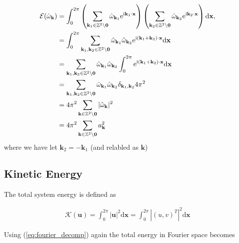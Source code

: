 \documentclass[9pt]{article}
\newcommand{\ii}{\mathrm{i}}      								  %
\newcommand{\e}{\mathrm{e}}      								  %
\newcommand{\bfu}{\mathbf{u}}											%
\newcommand{\omegahat}[1]{\hat{\omega}_{ \mathbf{#1} } }								%
\newcommand{\bfx}{\mathbf{x}}								%
\newcommand{\bfk}{\mathbf{k}}								%
\newcommand{\bfkn}[1]{\mathbf{k}_{#1}}								%
\begin{document}
\begin{align}
	\mathcal{E}(\omegahat{k}) &= \int_{0}^{2\pi} \left(\sum_{\mathbf{k}_1\in \mathbb{Z}^2\setminus \mathbf{0}}\hat{\omega}_{\mathbf{k}_1}\e^{\ii \mathbf{k}_1\cdot \mathbf{x}}\right)\left(\sum_{\mathbf{k}_2\in \mathbb{Z}^2\setminus \mathbf{0}}\hat{\omega}_{\mathbf{k}_2}\e^{\ii \mathbf{k}_2\cdot \mathbf{x}}\right)  \mathrm{d}\bfx, \notag \\
	&= \int_{0}^{2\pi}\sum_{\mathbf{k}_1, \bfkn{2}\in \mathbb{Z}^2\setminus \mathbf{0}}\hat{\omega}_{\mathbf{k}_1}\hat{\omega}_{\mathbf{k}_2} \e^{\ii \left(\mathbf{k}_1 + \bfkn{2}\right)\cdot \mathbf{x}}\mathrm{d}\bfx \notag \\
	&=\sum_{\mathbf{k}_1, \bfkn{2}\in \mathbb{Z}^2\setminus \mathbf{0}}\hat{\omega}_{\mathbf{k}_1}\hat{\omega}_{\mathbf{k}_2} \int_{0}^{2\pi} \e^{\ii \left(\mathbf{k}_1 + \bfkn{2}\right)\cdot \mathbf{x}}\mathrm{d}\bfx \notag \\
	&= \sum_{\mathbf{k}_1, \bfkn{2}\in \mathbb{Z}^2\setminus \mathbf{0}}\hat{\omega}_{\mathbf{k}_1}\hat{\omega}_{\mathbf{k}_2} \delta_{\bfkn{1}, \bfkn{2}} 4 \pi^2 \notag \\
	&= 4 \pi^2 \sum_{\mathbf{k}\in \mathbb{Z}^2\setminus \mathbf{0}}|\hat{\omega}_{\mathbf{k}} |^2 \notag \\
	&= 4 \pi^2 \sum_{\mathbf{k}\in \mathbb{Z}^2\setminus \mathbf{0}} a_{\bfk}^2
	\label{eq:enstrophy_fourier}
\end{align}
where we have let $\bfkn{2} = - \bfkn{1}$ (and relabled as $\bfk$)


\subsection{Kinetic Energy}

The total system energy is defined as

\begin{align}
	\mathcal{K}(\bfu) = \int_0^{2 \pi}|\bfu|^2\mathrm{d}\bfx = \int_0^{2\pi} |(u, v)^{T}|^2 \mathrm{d}\bfx 
\end{align}

Using (\ref{eq:fourier_decomp}) again the total energy in Fourier space becomes
\end{document}
